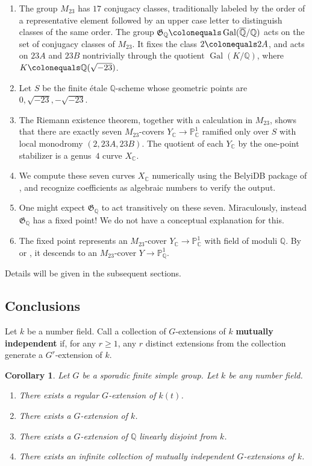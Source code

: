 \documentclass[12pt,reqno]{amsart}
\newcommand{\deficolor}{ForestGreen}
\newcommand{\defi}[1]{\textbf{\color{\deficolor} #1}} %
\newcommand{\C}{\mathbb{C}}
\newcommand{\PP}{\mathbb{P}}
\newcommand{\Q}{\mathbb{Q}}
\newcommand{\Qbar}{{\overline{\Q}}}
\newcommand{\GG}{\mathfrak{G}}
\DeclareMathOperator{\Gal}{Gal}
\newtheorem{corollary}[theorem]{Corollary}
\theoremstyle{definition}
\theoremstyle{remark}
\begin{document}
\begin{enumerate}[\upshape 1.]
\item The group $M_{23}$ has $17$ conjugacy classes, traditionally labeled by the order of a representative element followed by an upper case letter to distinguish classes of the same order.
The group $\GG_\Q \colonequals \Gal(\Qbar/\Q)$ acts on the set of conjugacy classes of $M_{23}$.
It fixes the class $2 \colonequals 2A$, and acts on $23A$ and $23B$ nontrivially through the quotient $\Gal(K/\Q)$, where $K \colonequals \Q(\sqrt{-23})$.
\item
Let $S$ be the finite \'etale $\Q$-scheme whose geometric points are $0,\sqrt{-23},-\sqrt{-23}$.
\item 
The Riemann existence theorem, together with a calculation in $M_{23}$, shows that there are exactly 
seven $M_{23}$-covers $Y_\C \to \PP^1_\C$ ramified only over $S$ with local monodromy $(2,23A,23B)$.
The quotient of each $Y_\C$ by the one-point stabilizer is a genus~$4$ curve $X_\C$.
\item
We compute these seven curves $X_\C$ numerically using the BelyiDB package of \cite{Musty-Schiavone-Sijsling-Voight2019},
and recognize coefficients as algebraic numbers to verify the output.
\item 
One might expect $\GG_\Q$ to act transitively on these seven.
Miraculously, instead $\GG_\Q$ has a fixed point! 
We do not have a conceptual explanation for this.
\item
The fixed point represents an $M_{23}$-cover $Y_\C \to \PP^1_\C$ with field of moduli $\Q$.
By \cite[Proposition 2.8(c)]{CoombesHarbater} %
or
\cite[Proposition~3.1(b) and Corollary~3.2]{DebesDouai}, %
it descends to an $M_{23}$-cover $Y \to \PP^1_\Q$. 
\end{enumerate}

Details will be given in the subsequent sections.

\subsection{Conclusions}

Let $k$ be a number field.
Call a collection of $G$-extensions of $k$ \defi{mutually independent} if, for any $r \ge 1$, any $r$ distinct extensions from the collection generate a $G^r$-extension of $k$.

\begin{corollary}
Let $G$ be a sporadic finite simple group.
Let $k$ be any number field.
\begin{enumerate}[\upshape (a)]
\item \label{I:sporadic over Q(t)}
    There exists a regular $G$-extension of $k(t)$.
\item \label{I:sporadic over Q}
    There exists a $G$-extension of $k$.
\item \label{I:linearly disjoint}
    There exists a $G$-extension of $\Q$ linearly disjoint from $k$.
\item \label{I:mutually independent}
    There exists an infinite collection of mutually independent $G$-extensions of $k$.
\end{enumerate}
\end{corollary}
\end{document}
